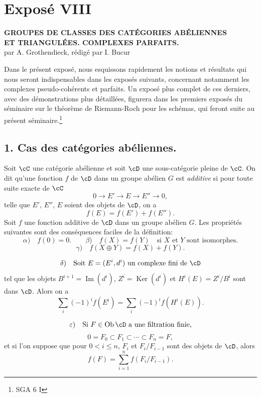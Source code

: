 \newpage
\section*{Exposé VIII}
\renewcommand{\Ob}{\operatorname{Ob}}

\begin{center}
\textbf{GROUPES DE CLASSES DES CATÉGORIES ABÉLIENNES}\\
\textbf{ET TRIANGULÉES. COMPLEXES PARFAITS.}\\[1ex]
par A. Grothendieck, rédigé par I. Bucur
\end{center}

Dans le présent exposé, nous esquissons rapidement les notions et résultats qui nous seront indispensables dans les exposés suivants, concernant notamment les complexes pseudo-cohérents et parfaits. Un exposé plus complet de ces derniers, avec des démonstrations plus détaillées, figurera dans les premiers exposés du séminaire sur le théorème de Riemann-Roch pour les schémas, qui feront suite au présent séminaire.\footnote{SGA 6 I}

\subsection*{1. Cas des catégories abéliennes.}

Soit $\cC$ une catégorie abélienne et soit $\cD$ une sous-catégorie pleine de $\cC$. On dit qu'une fonction $f$ de $\cD$ dans un groupe abélien $G$ est \emph{additive} si pour toute suite exacte de $\cC$
\[
0\longrightarrow E'\longrightarrow E\longrightarrow E''\longrightarrow 0,
\]
telle que $E'$, $E''$, $E$ soient des objets de $\cD$, on a
\[
f(E)=f(E')+f(E'').
\]
Soit $f$ une fonction additive de $\cD$ dans un groupe abélien $G$. Les propriétés suivantes sont des conséquences faciles de la définition:
\[
\alpha)\quad f(0)=0.\qquad
\beta)\quad f(X)=f(Y)\quad\text{si }X\text{ et }Y\text{ sont isomorphes.}
\]
\[
\gamma)\quad f(X\oplus Y)=f(X)+f(Y).
\]

\[
\delta)\quad
\text{Soit }E=(E^i,d^i)\text{ un complexe fini de }\cD
\]
tel que les objets $B^{i+1}=\operatorname{Im}(d^i)$, $Z^i=\operatorname{Ker}(d^i)$ et $H^i(E)=Z^i/B^i$ sont dans $\cD$. Alors on a
\[
\sum_i (-1)^i f(E^i)=\sum_i (-1)^i f(H^i(E)).
\]

\[
\varepsilon)\quad
\text{Si }F\in\Ob \cD\text{ a une filtration finie,}
\]
\[
0=F_0\subset F_1\subset\cdots\subset F_n=F,
\]
et si l'on suppose que pour $0<i\le n$, $F_i$ et $F_i/F_{i-1}$ sont des objets de $\cD$, alors
\[
f(F)=\sum_{i=1}^n f(F_i/F_{i-1}).
\]

